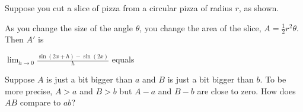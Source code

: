 \documentclass{ximera}
\newcommand{\recommendation}[1]{}
\newcommand{\GoodQuestions}[1]{}
\begin{document}
\begin{shuffle}
\begin{problem}
  \GoodQuestions{Subject: Derivative Rules 4Q}
  Suppose you cut a slice of pizza from a circular pizza of radius
  $r$, as shown.
  \begin{image}
  \end{image}
  As you change the size of the angle $\theta$, you change the area of
  the slice, $A=\frac{1}{2}r^2\theta$. Then $A'$ is
  \begin{multipleChoice}
  \end{multipleChoice}
\end{problem}



\begin{problem}
  \recommendation{Vic}

  \GoodQuestions{Subject: Derivative Rules 15P}
  $\lim_{h\to 0}\frac{\sin (2x+h)-\sin (2x)}{h}$ equals
  \begin{multipleChoice}
  \end{multipleChoice}
\end{problem}




\begin{problem}
  Suppose $A$ is just a bit bigger than $a$ and $B$ is just a bit
  bigger than $b$.  To be more precise, $A > a$ and $B > b$ but
  $A - a$ and $B-b$ are close to zero.  How does $AB$ compare to $ab$?
  \begin{multipleChoice}
  \end{multipleChoice}
\end{problem}


\end{shuffle}
\end{document}
